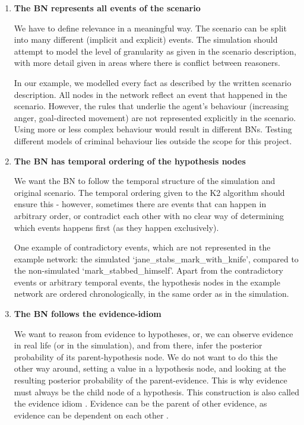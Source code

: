 \begin{enumerate}
\item \textbf{The BN represents all events of the scenario}

We have to define relevance in a meaningful way. The scenario can be split into many different (implicit and explicit) events. The simulation should attempt to model the level of granularity as given in the scenario description, with more detail given in areas where there is conflict between reasoners.

In our example, we modelled every fact as described by the written scenario description. All nodes in the network reflect an event that happened in the scenario. However, the rules that underlie the agent's behaviour (increasing anger, goal-directed movement) are not represented explicitly in the scenario. Using more or less complex behaviour would result in different BNs. Testing different models of criminal behaviour lies outside the scope for this project.

\item \textbf{The BN has temporal ordering of the hypothesis nodes}

We want the BN to follow the temporal structure of the simulation and original scenario. The temporal ordering given to the K2 algorithm should ensure this - however, sometimes there are events that can happen in arbitrary order, or contradict each other with no clear way of determining which events happens first (as they happen exclusively).  

One example of contradictory events, which are not represented in the example network: the simulated `jane\_stabs\_mark\_with\_knife', compared to the non-simulated `mark\_stabbed\_himself'. Apart from the contradictory events or arbitrary temporal events, the hypothesis nodes in the example network are ordered chronologically, in the same order as in the simulation.

\item \textbf{The BN follows the evidence-idiom}

We want to reason from evidence to hypotheses, or, we can observe evidence in real life (or in the simulation), and from there, infer the posterior probability of its parent-hypothesis node. We do not want to do this the other way around, setting a value in a hypothesis node, and looking at the resulting posterior probability of the parent-evidence. This is why evidence must always be the child node of a hypothesis. This construction is also called the evidence idiom \citep{Fenton2012}. Evidence can be the parent of other evidence, as evidence can be dependent on each other \citep{Fenton}.


\end{enumerate}
